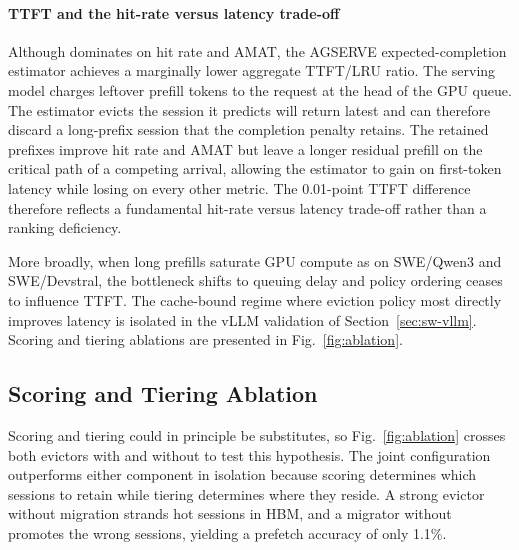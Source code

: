 \paragraph{TTFT and the hit-rate versus latency trade-off}
Although \unison dominates on hit rate and AMAT, the AGSERVE
expected-completion estimator achieves a marginally lower aggregate
TTFT/LRU ratio. The serving model charges leftover prefill tokens to
the request at the head of the GPU queue. The estimator evicts the
session it predicts will return latest and can therefore discard a
long-prefix session that the \unison completion penalty retains. The
retained prefixes improve hit rate and AMAT but leave a longer residual
prefill on the critical path of a competing arrival, allowing the
estimator to gain on first-token latency while losing on every other
metric. The
0.01-point TTFT difference therefore reflects a fundamental
hit-rate versus latency trade-off rather than a ranking deficiency.

More broadly, when long prefills saturate GPU compute as on
SWE/Qwen3 and SWE/Devstral, the bottleneck shifts to queuing delay and
policy ordering ceases to influence TTFT. The cache-bound regime where
eviction policy most directly improves latency is isolated in the vLLM
validation of Section~\ref{sec:sw-vllm}. Scoring and tiering ablations
are presented in Fig.~\ref{fig:ablation}.



\subsection{Scoring and Tiering Ablation}
\label{sec:sw-comp}

Scoring and tiering could in principle be substitutes, so
Fig.~\ref{fig:ablation} crosses both evictors with and without \tide to
test this hypothesis. The joint \unison configuration outperforms either
component in isolation because scoring determines which sessions to
retain while tiering determines where they reside. A strong evictor
without migration strands hot sessions in HBM, and a migrator without
\esp promotes the wrong sessions, yielding a prefetch accuracy of only
1.1\%.

